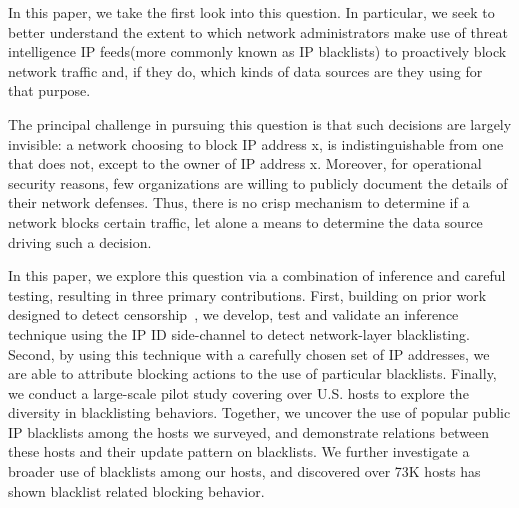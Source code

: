 In this paper, we take the first look into this question. In particular,
we seek to better understand the extent to which network administrators
make use of threat intelligence IP feeds(more commonly known as IP blacklists)
to proactively block network traffic and, if they do, which kinds of data
sources are they using for that purpose.

The principal challenge in pursuing this question is that such
decisions are largely invisible: a network choosing to block IP
address x, is indistinguishable from one that does not, except to the
owner of IP address x.  Moreover, for operational security reasons,
few organizations are willing to publicly document the details of
their network defenses.  Thus, there is no crisp mechanism to
determine if a network blocks certain traffic, let alone a means to
determine the data source driving such a decision.

In this paper, we explore this question via a combination of inference
and careful testing, resulting in three primary contributions.
First, building on prior work designed to detect
censorship~\cite{ensafi2014detecting, pearce2017augur}, we develop,
test and validate an inference technique using the IP ID side-channel to
detect network-layer blacklisting.  Second, by using this technique with a
carefully chosen set of IP addresses, we are able to attribute
blocking actions to the use of particular blacklists.  Finally, we conduct a
large-scale pilot study covering over {} U.S. hosts
to explore the diversity in blacklisting behaviors. Together, we
uncover the use of {\blacklistnum} popular public IP blacklists among
the hosts we surveyed, and demonstrate relations between these hosts
and their update pattern on blacklists. We further investigate a broader
use of blacklists among our hosts, and discovered over 73K hosts has
shown blacklist related blocking behavior.





